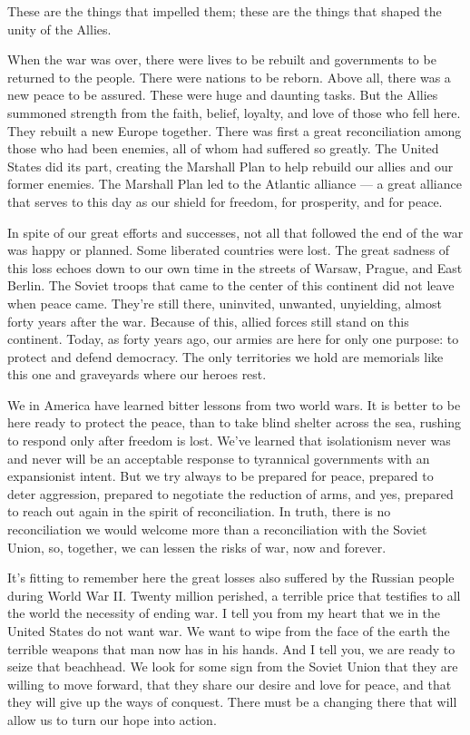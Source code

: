 \documentclass[a4paper]{amsbook}
\begin{document}
These are the things that impelled them; these are the things that shaped the unity of the Allies.

When the war was over, there were lives to be rebuilt and governments to be returned to the people. There were nations to be reborn. Above all, there was a new peace to be assured. These were huge and daunting tasks. But the Allies summoned strength from the faith, belief, loyalty, and love of those who fell here. They rebuilt a new Europe together. There was first a great reconciliation among those who had been enemies, all of whom had suffered so greatly. The United States did its part, creating the Marshall Plan to help rebuild our allies and our former enemies. The Marshall Plan led to the Atlantic alliance — a great alliance that serves to this day as our shield for freedom, for prosperity, and for peace.

In spite of our great efforts and successes, not all that followed the end of the war was happy or planned. Some liberated countries were lost. The great sadness of this loss echoes down to our own time in the streets of Warsaw, Prague, and East Berlin. The Soviet troops that came to the center of this continent did not leave when peace came. They're still there, uninvited, unwanted, unyielding, almost forty years after the war. Because of this, allied forces still stand on this continent. Today, as forty years ago, our armies are here for only one purpose: to protect and defend democracy. The only territories we hold are memorials like this one and graveyards where our heroes rest.

We in America have learned bitter lessons from two world wars. It is better to be here ready to protect the peace, than to take blind shelter across the sea, rushing to respond only after freedom is lost. We've learned that isolationism never was and never will be an acceptable response to tyrannical governments with an expansionist intent. But we try always to be prepared for peace, prepared to deter aggression, prepared to negotiate the reduction of arms, and yes, prepared to reach out again in the spirit of reconciliation. In truth, there is no reconciliation we would welcome more than a reconciliation with the Soviet Union, so, together, we can lessen the risks of war, now and forever.

It's fitting to remember here the great losses also suffered by the Russian people during World War II. Twenty million perished, a terrible price that testifies to all the world the necessity of ending war. I tell you from my heart that we in the United States do not want war. We want to wipe from the face of the earth the terrible weapons that man now has in his hands. And I tell you, we are ready to seize that beachhead. We look for some sign from the Soviet Union that they are willing to move forward, that they share our desire and love for peace, and that they will give up the ways of conquest. There must be a changing there that will allow us to turn our hope into action.
\end{document}
